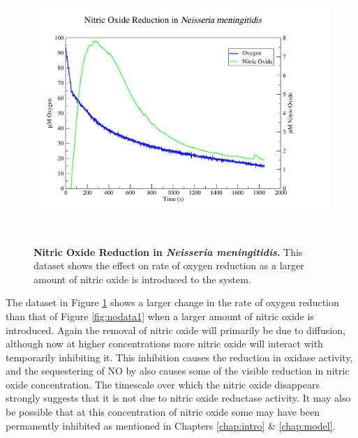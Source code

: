 \begin{figure}[tbp]
 \centering
 \includegraphics[height=10cm, trim=2cm 1cm 4cm 1cm]{./06-noreduction/data/aer-no-data2.pdf}
 \caption[{Nitric Oxide Reduction in \textit{Neisseria meningitidis}.}]{{\bf Nitric Oxide Reduction in \textit{Neisseria meningitidis}.} This dataset shows the effect on rate of oxygen reduction as a larger amount of nitric oxide is introduced to the system.}
 \label{fig:nodata2}
\end{figure}
The dataset in Figure \ref{fig:nodata2} shows a larger change in the rate of oxygen reduction than that of Figure \ref{fig:nodata1} when a larger amount of nitric oxide is introduced. Again the removal of nitric oxide will primarily be due to diffusion, although now at higher concentrations more nitric oxide will interact with \cbbthree{} temporarily inhibiting it. This inhibition causes the reduction in oxidase activity, and the sequestering of NO by \cbbthree{} also causes some of the visible reduction in nitric oxide concentration. The timescale over which the nitric oxide disappears strongly suggests that it is not due to nitric oxide reductase activity. It may also be possible that at this concentration of nitric oxide some \cbbthree{} may have been permanently inhibited as mentioned in Chapters \ref{chap:intro} \& \ref{chap:model}.

